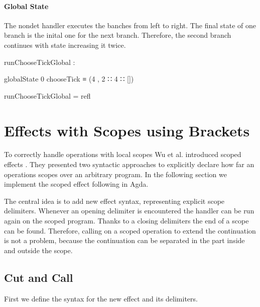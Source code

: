 \paragraph{Global State}
The nondet handler executes the banches from left to right.
The final state of one branch is the inital one for the next branch.
Therefore, the second branch continues with state  increasing it
twice.

\begin{center}
\begin{code}
runChooseTickGlobal :
\end{code}
\begin{code}[inline]
 globalState 0 chooseTick ≡ (4 , 2 ∷ 4 ∷ [])
\end{code}
\begin{code}
runChooseTickGlobal = refl
\end{code}
\end{center}


\section{Effects with Scopes using Brackets}
\label{fist-order:scoped-effects}

To correctly handle operations with local scopes Wu et al. introduced scoped
effects \cite{DBLP:conf/haskell/WuSH14}.
They presented two syntactic approaches to explicitly declare how far an
operations scopes over an arbitrary program.
In the following section we implement the scoped effect
 following \cite{DBLP:conf/haskell/WuSH14} in Agda.

The central idea is to add new effect syntax, representing explicit scope
delimiters.
Whenever an opening delimiter is encountered the handler can be run again on the
scoped program.
Thanks to a closing delimiters the end of a scope can be found.
Therefore, calling \AgdaFunction{>>=} on a scoped operation to extend the
continuation is not a problem, because the continuation can be separated in the
part inside and outside the scope.


\subsection{Cut and Call}

First we define the syntax for the new effect and its delimiters.


